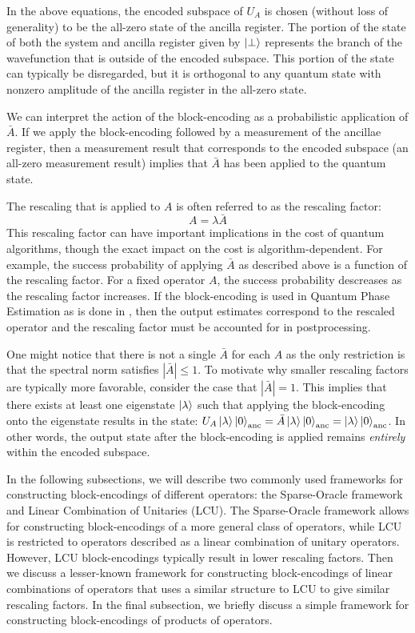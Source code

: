 In the above equations, the encoded subspace of $U_A$ is chosen (without loss of generality) to be the all-zero state of the ancilla register.
The portion of the state of both the system and ancilla register given by $\ket{\perp}$ represents the branch of the wavefunction that is outside of the encoded subspace.
This portion of the state can typically be disregarded, but it is orthogonal to any quantum state with nonzero amplitude of the ancilla register in the all-zero state.

We can interpret the action of the block-encoding as a probabilistic application of $\bar{A}$.
If we apply the block-encoding followed by a measurement of the ancillae register, then a measurement result that corresponds to the encoded subspace (an all-zero measurement result) implies that $\bar{A}$ has been applied to the quantum state.

The rescaling that is applied to $A$ is often referred to as the rescaling factor:
\begin{equation}
    A = \lambda \bar{A}
\end{equation}
This rescaling factor can have important implications in the cost of quantum algorithms, though the exact impact on the cost is algorithm-dependent.
For example, the success probability of applying $\bar{A}$ as described above is a function of the rescaling factor.
For a fixed operator $A$, the success probability descreases as the rescaling factor increases. 
If the block-encoding is used in Quantum Phase Estimation as is done in \cite{poulin2018quantum, babbush2018encoding, lee2021even}, then the output estimates correspond to the rescaled operator and the rescaling factor must be accounted for in postprocessing.

One might notice that there is not a single $\bar{A}$ for each $A$ as the only restriction is that the spectral norm satisfies $|\bar{A}| \leq 1$.
To motivate why smaller rescaling factors are typically more favorable, consider the case that $|\bar{A}| = 1$.
This implies that there exists at least one eigenstate $\ket{\lambda}$ such that applying the block-encoding onto the eigenstate results in the state: $U_A \ket{\lambda}\ket{0}_{\text{anc}} = \bar{A} \ket{\lambda}\ket{0}_{\text{anc}} = \ket{\lambda}\ket{0}_{\text{anc}}$.
In other words, the output state after the block-encoding is applied remains \textit{entirely} within the encoded subspace.

In the following subsections, we will describe two commonly used frameworks for constructing block-encodings of different operators: the Sparse-Oracle framework and Linear Combination of Unitaries (LCU).
The Sparse-Oracle framework allows for constructing block-encodings of a more general class of operators, while LCU is restricted to operators described as a linear combination of unitary operators.
However, LCU block-encodings typically result in lower rescaling factors. 
Then we discuss a lesser-known framework for constructing block-encodings of linear combinations of operators that uses a similar structure to LCU to give similar rescaling factors.
In the final subsection, we briefly discuss a simple framework for constructing block-encodings of products of operators.

